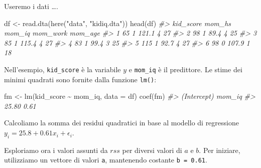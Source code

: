 \documentclass[
  10pt,
  italian,
  a4paper,
  extrafontsizes,onecolumn,openright
  ]{memoir}
\newenvironment{Shaded}{\begin{snugshade}}{\end{snugshade}}
\newcommand{\AttributeTok}[1]{\textcolor[rgb]{0.77,0.63,0.00}{#1}}
\newcommand{\CommentTok}[1]{\textcolor[rgb]{0.56,0.35,0.01}{\textit{#1}}}
\newcommand{\FloatTok}[1]{\textcolor[rgb]{0.00,0.00,0.81}{#1}}
\newcommand{\FunctionTok}[1]{\textcolor[rgb]{0.00,0.00,0.00}{#1}}
\newcommand{\NormalTok}[1]{#1}
\newcommand{\OtherTok}[1]{\textcolor[rgb]{0.56,0.35,0.01}{#1}}
\newcommand{\SpecialCharTok}[1]{\textcolor[rgb]{0.00,0.00,0.00}{#1}}
\newcommand{\StringTok}[1]{\textcolor[rgb]{0.31,0.60,0.02}{#1}}
\begin{document}
Useremo i dati \ldots.

\begin{Shaded}
\begin{Highlighting}[]
\NormalTok{df }\OtherTok{\textless{}{-}} \FunctionTok{read.dta}\NormalTok{(}\FunctionTok{here}\NormalTok{(}\StringTok{"data"}\NormalTok{, }\StringTok{"kidiq.dta"}\NormalTok{))}
\FunctionTok{head}\NormalTok{(df)}
\CommentTok{\#\textgreater{}   kid\_score mom\_hs mom\_iq mom\_work mom\_age}
\CommentTok{\#\textgreater{} 1        65      1  121.1        4      27}
\CommentTok{\#\textgreater{} 2        98      1   89.4        4      25}
\CommentTok{\#\textgreater{} 3        85      1  115.4        4      27}
\CommentTok{\#\textgreater{} 4        83      1   99.4        3      25}
\CommentTok{\#\textgreater{} 5       115      1   92.7        4      27}
\CommentTok{\#\textgreater{} 6        98      0  107.9        1      18}
\end{Highlighting}
\end{Shaded}

Nell'esempio, \texttt{kid\_score} è la variabile \(y\) e \texttt{mom\_iq} è il predittore. Le stime dei minimi quadrati sono fornite dalla funzione \texttt{lm()}:

\begin{Shaded}
\begin{Highlighting}[]
\NormalTok{fm }\OtherTok{\textless{}{-}} \FunctionTok{lm}\NormalTok{(kid\_score }\SpecialCharTok{\textasciitilde{}}\NormalTok{ mom\_iq, }\AttributeTok{data =}\NormalTok{ df)}
\FunctionTok{coef}\NormalTok{(fm)}
\CommentTok{\#\textgreater{} (Intercept)      mom\_iq }
\CommentTok{\#\textgreater{}       25.80        0.61}
\end{Highlighting}
\end{Shaded}

Calcoliamo la somma dei residui quadratici in base al modello di regressione \(y_i = 25.8 + 0.61 x_i + \epsilon_i\).

\begin{Shaded}
\end{Shaded}

Esploriamo ora i valori assunti da \(rss\) per diversi valori di \(a\) e \(b\). Per iniziare, utilizziamo un vettore di valori \texttt{a}, mantenendo costante \texttt{b\ =\ 0.61}.
\end{document}
